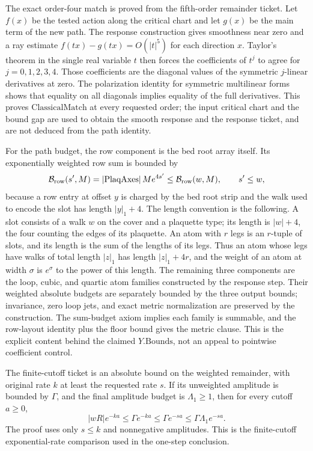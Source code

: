 The exact order-four match is proved from the fifth-order remainder ticket.
Let $f(x)$ be the tested action along the critical chart and let $g(x)$ be
the main term of the new path. The response construction gives smoothness
near zero and a ray estimate $f(tx)-g(tx)=O(|t|^5)$ for each direction $x$.
Taylor's theorem in the single real variable $t$ then forces the coefficients
of $t^j$ to agree for $j=0,1,2,3,4$. Those coefficients are the diagonal
values of the symmetric $j$-linear derivatives at zero. The polarization
identity for symmetric multilinear forms shows that equality on all
diagonals implies equality of the full derivatives. This proves
$\mathrm{ClassicalMatch}$ at every requested order; the input critical chart
and the bound gap are used to obtain the smooth response and the response
ticket, and are not deduced from the path identity.

For the path budget, the row component is the bed root array itself. Its
exponentially weighted row sum is bounded by
\[
 \mathcal B_{\rm row}(s',M)=|\mathrm{PlaqAxes}|\,M e^{4s'}
 \leq \mathcal B_{\rm row}(w,M),\qquad s'\leq w,
\]
because a row entry at offset $y$ is charged by the bed root strip and the
walk used to encode the slot has length $|y|_1+4$. The length convention
is the following. A slot consists of a walk $w$ on the cover and a
plaquette type; its length is $|w|+4$, the four counting the edges of
its plaquette. An atom with $r$ legs is an $r$-tuple of slots, and its
length is the sum of the lengths of its legs. Thus an atom whose legs
have walks of total length $|z|_1$ has length $|z|_1+4r$, and the
weight of an atom at width $\sigma$ is $e^{\sigma}$ to the power of
this length. The remaining three
components are the loop, cubic, and quartic atom families constructed by
the response step. Their weighted absolute budgets are separately bounded
by the three output bounds; invariance, zero loop jets, and exact metric
normalization are preserved by the construction. The sum-budget axiom
implies each family is summable, and the row-layout identity plus the floor
bound gives the metric clause. This is the explicit content behind the
claimed $Y.\mathrm{Bounds}$, not an appeal to pointwise coefficient control.

The finite-cutoff ticket is an absolute bound on the weighted remainder,
with original rate $k$ at least the requested rate $s$. If its unweighted
amplitude is bounded by $\Gamma$, and the final amplitude budget is
$\Lambda_1\geq1$, then for every cutoff $a\geq0$,
\[
 |wR|e^{-ka}\leq\Gamma e^{-ka}\leq\Gamma e^{-sa}
       \leq\Gamma\Lambda_1e^{-sa}.
\]
The proof uses only $s\leq k$ and nonnegative amplitudes. This is the
finite-cutoff exponential-rate comparison used in the one-step conclusion.

